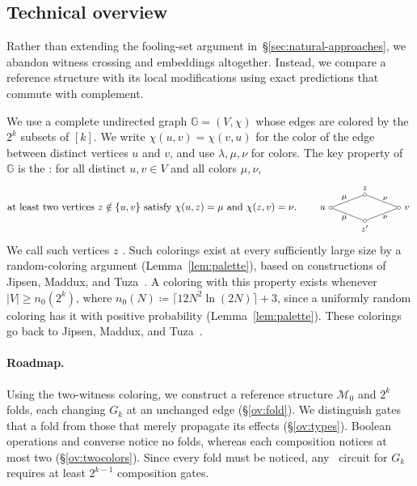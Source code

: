 \subsection{Technical overview}\label{sec:approach}\label{sec:overview}\label{ov:structure}

Rather than extending the fooling-set argument in~\S\ref{sec:natural-approaches}, we abandon witness crossing and embeddings altogether. Instead, we compare a reference structure with its local modifications using exact predictions that commute with complement.

\smallskip
{}
We use a complete undirected graph $\mathbb{G} = (V,\chi)$ whose edges are colored by the $2^k$ subsets of $[k]$.
We write $\chi(u,v)=\chi(v,u)$ for the color of the edge between distinct vertices $u$ and $v$,
and use $\lambda,\mu,\nu$ for colors.
The key property of $\mathbb{G}$ is the : for all distinct
$u,v\in V$ and all colors $\mu,\nu$,
\[
\text{at least two vertices $z\notin\{u,v\}$ satisfy $\chi(u,z)=\mu$ and
 $\chi(z,v)=\nu$.}
 \qquad
 \begin{tikzpicture}[baseline={([yshift=-0.55ex]u.center)},
   every node/.style={font=\footnotesize},vtx/.style={circle,draw,inner sep=1.2pt}]
 \node[vtx,label={[font=\small]left:$u$}] (u) at (0,0) {};
 \node[vtx,label={[font=\small]right:$v$}] (v) at (2.4,0) {};
 \node[vtx,label={[label distance=-1pt]above:$z$}] (z) at (1.2,0.46) {};
 \node[vtx,label={[label distance=-1pt]below:$z'$}] (z2) at (1.2,-0.46) {};
 \draw (u) -- node[above left=-2.5pt] {$\mu$} (z);
 \draw (z) -- node[above right=-2.5pt] {$\nu$} (v);
 \draw (u) -- node[below left=-2.5pt] {$\mu$} (z2);
 \draw (z2) -- node[below right=-2.5pt] {$\nu$} (v);
 \end{tikzpicture}
\]
We call such vertices $z$ .
Such colorings exist at every sufficiently large size by a random-coloring argument (Lemma~\ref{lem:palette}), based on constructions of Jipsen, Maddux, and Tuza~\citep{jipsen-maddux-tuza1995}.
A coloring with this property exists whenever
$|V|\ge n_0(2^k)$, where
$n_0(N)\coloneqq\lceil12N^2\ln(2N)\rceil+3$, since a uniformly random
coloring has it with positive probability
(Lemma~\ref{lem:palette}). These colorings go back to Jipsen, Maddux, and
Tuza~\citep{jipsen-maddux-tuza1995}.
\fi

\paragraph{Roadmap.}
Using the two-witness coloring, we construct a
reference structure $\mathcal M_0$ and $2^k$ folds,
each changing $G_k$ at an unchanged edge (\S\ref{ov:fold}).
%
We distinguish gates that  a fold
from those that merely propagate its effects (\S\ref{ov:types}).
%
Boolean operations and converse notice no folds,
whereas each composition notices at most two (\S\ref{ov:twocolors}).
%
Since every fold must be noticed,
any \CoR\ circuit for $G_k$ requires at least $2^{k-1}$ composition gates.

